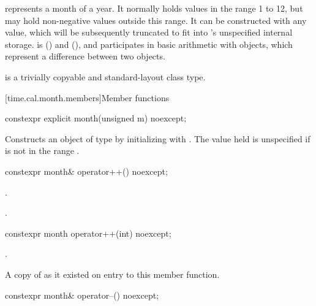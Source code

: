 \pnum
{} represents a month of a year.
It normally holds values in the range 1 to 12,
but may hold non-negative values outside this range.
It can be constructed with any  value,
which will be subsequently truncated to fit into 's unspecified internal storage.
 is  ()
and  (),
and participates in basic arithmetic with  objects,
which represent a difference between two  objects.

\pnum
{} is a trivially copyable and standard-layout class type.

[time.cal.month.members]{Member functions}

%
\begin{itemdecl}
constexpr explicit month(unsigned m) noexcept;
\end{itemdecl}

\begin{itemdescr}
\pnum
\effects
Constructs an object of type  by
initializing  with .
The value held is unspecified if  is not in the range .
\end{itemdescr}

%
\begin{itemdecl}
constexpr month& operator++() noexcept;
\end{itemdecl}

\begin{itemdescr}
\pnum
\effects
{}.

\pnum
\returns
{}.
\end{itemdescr}

%
\begin{itemdecl}
constexpr month operator++(int) noexcept;
\end{itemdecl}

\begin{itemdescr}
\pnum
\effects
{}.

\pnum
\returns
A copy of  as it existed on entry to this member function.
\end{itemdescr}

%
\begin{itemdecl}
constexpr month& operator--() noexcept;
\end{itemdecl}

